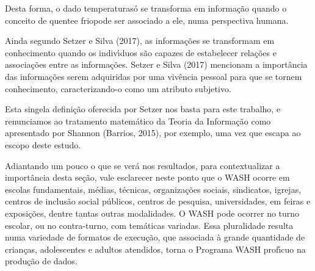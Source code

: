 \documentclass[
12pt,		%
openright,	%
twoside,  %
a4paper,			%
chapter=TITLE,		%
english,			%
french,				%
spanish,			%
brazil				%
]{USPSC-classe/USPSC}
\begin{document}
Desta forma, o dado \textquotedbl temperatura\textquotedbl  s\'o se transforma em informa\c{c}\~ao quando o conceito de \textquotedbl quente\textquotedbl  e \textquotedbl frio\textquotedbl  pode ser associado a ele, numa perspectiva humana.

















Ainda segundo Setzer e Silva (2017), as informa\c{c}\~oes se transformam em conhecimento quando os indiv\'{\i}duos s\~ao capazes de estabelecer rela\c{c}\~oes e associa\c{c}\~oes entre as informa\c{c}\~oes.  Setzer e Silva (2017) mencionam a import\^ancia das informa\c{c}\~oes serem adquiridas por uma viv\^encia pessoal para que se tornem conhecimento, caracterizando-o como um atributo subjetivo.

















Esta singela defini\c{c}\~ao oferecida por Setzer nos basta para este trabalho, e renunciamos ao tratamento matem\'atico da Teoria da Informa\c{c}\~ao como apresentado por Shannon (Barrios, 2015), por exemplo, uma vez que escapa ao escopo deste estudo.

















Adiantando um pouco o que se ver\'a nos resultados, para contextualizar a import\^ancia desta se\c{c}\~ao, vale esclarecer neste ponto que o WASH ocorre  em escolas fundamentais, m\'edias, t\'ecnicas, organiza\c{c}\~oes sociais, sindicatos, igrejas, centros de inclus\~ao social p\'ublicos, centros de pesquisa, universidades, em feiras e exposi\c{c}\~oes, dentre tantas outras modalidades. O WASH pode ocorrer no turno escolar, ou no contra-turno, com tem\'aticas variadas.  Essa pluralidade resulta numa variedade de formatos de execu\c{c}\~ao, que associada \`a grande quantidade de crian\c{c}as, adolescentes e adultos atendidos, torna o Programa WASH prof\'{\i}cuo na produ\c{c}\~ao de dados.
\end{document}
